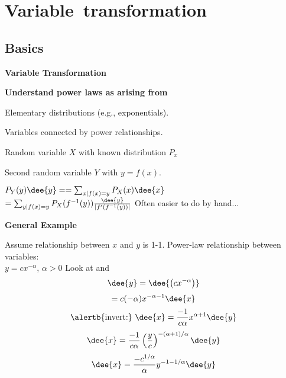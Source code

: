   



%
% 


\section{Variable\ transformation}

\subsection{Basics}


  \textbf{Variable Transformation}

  \textbf{Understand power laws as arising from}
    
    
      Elementary distributions (e.g., exponentials).
    
      Variables connected by power relationships.
    
  

  
  
   
    Random variable $X$ with known distribution $P_x$
   
    Second random variable $Y$ with $y=f(x)$.
  
      
    
     
      $ P_Y(y) \dee{y} = = \sum_{x | f(x) = y} P_X(x) \dee{x} $ \\
      $ = \sum_{y | f(x) = y}
      P_X( f^{-1}(y) )
      \frac{\dee{y}}
      {
        \left|
          f'(f^{-1}(y))
        \right|
      }
      $
     Often easier to do by hand...
    
    
    




  \textbf{General Example}
    
    
      Assume relationship between $x$ and $y$ is 1-1.
     Power-law relationship between variables: \\
      $y = c x^{-\alpha}$, $\alpha > 0$
     Look at  and 
     $$ \dee{y} = \dee{\left(cx^{-\alpha }\right)}  $$
      {$$  = c(-\alpha)x^{-\alpha-1} \dee{x}  $$}
      {
        $$ \mbox{\alertb{invert:}} \ \dee{x} = \frac{-1}{c\alpha}
        x^{\alpha+1} \dee{y}
        $$
      }
      {
        $$ \dee{x} = \frac{-1}{c\alpha}
        \left(\frac{y}{c}\right)^{-(\alpha+1)/\alpha} \dee{y}
        $$
      }
      {
        $$ \dee{x} = \frac{-c^{1/\alpha}}{\alpha}
        y^{-1-1/\alpha} \dee{y}
        $$
      }
    
